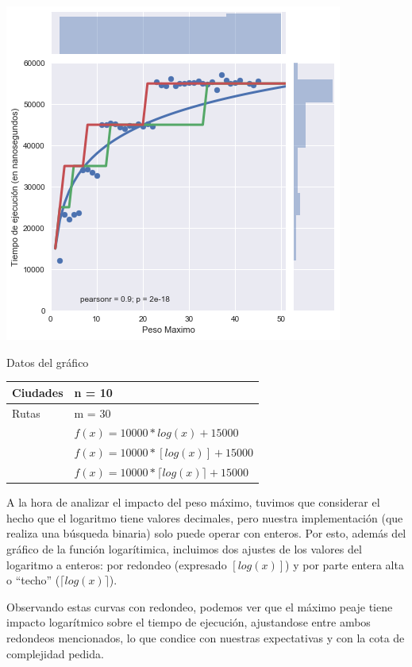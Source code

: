 \noindent
\begin{minipage}{0.55\textwidth}
	\hfill
	\includegraphics[scale=0.65]{imagenes/ej2-3.png}
\end{minipage}
\hfill
\begin{minipage}{0.42\textwidth}
	\begin{center}
		Datos del gráfico

		\begin{tabular}{ | l l |}
			\hline
			Ciudades & n = 10 \\ \hline
			Rutas & m = 30 \\ \hline
			\tikzcircle[fill=blue] & $f(x) = 10000 * log(x) + 15000$ \\
			\tikzcircle[fill=green] & $f(x) = 10000 * [ log(x) ] + 15000$ \\
			\tikzcircle & $f(x) = 10000 * \lceil log(x) \rceil + 15000$ \\
			\hline
		\end{tabular}
	\end{center}
\end{minipage}

A la hora de analizar el impacto del peso máximo, tuvimos que considerar el hecho que el logaritmo tiene valores decimales, pero nuestra implementación (que realiza una búsqueda binaria) solo puede operar con enteros. Por esto, además del gráfico de la función logarítimica, incluimos dos ajustes de los valores del logaritmo a enteros: por redondeo (expresado $[ log(x) ]$) y por parte entera alta o ``techo'' ($\lceil log(x) \rceil$).

Observando estas curvas con redondeo, podemos ver que el máximo peaje tiene impacto logarítmico sobre el tiempo de ejecución, ajustandose entre ambos redondeos mencionados, lo que condice con nuestras expectativas y con la cota de complejidad pedida.
